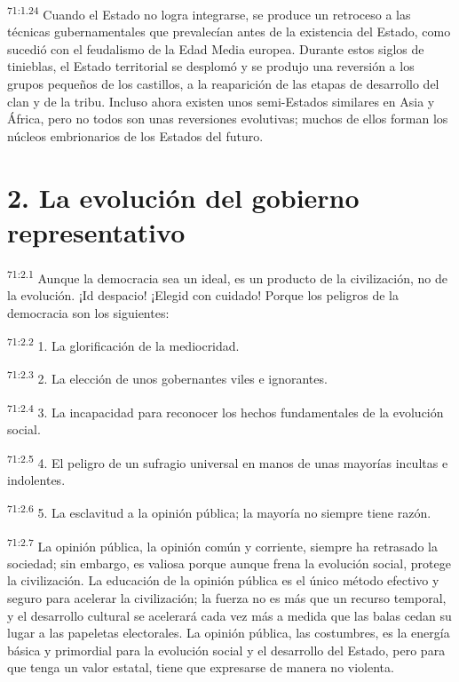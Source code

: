 \par
\textsuperscript{71:1.24} Cuando el Estado no logra integrarse, se produce un retroceso a las técnicas gubernamentales que prevalecían antes de la existencia del Estado, como sucedió con el feudalismo de la Edad Media europea. Durante estos siglos de tinieblas, el Estado territorial se desplomó y se produjo una reversión a los grupos pequeños de los castillos, a la reaparición de las etapas de desarrollo del clan y de la tribu. Incluso ahora existen unos semi-Estados similares en Asia y África, pero no todos son unas reversiones evolutivas; muchos de ellos forman los núcleos embrionarios de los Estados del futuro.

\section*{2. La evolución del gobierno representativo}
\par
\textsuperscript{71:2.1} Aunque la democracia sea un ideal, es un producto de la civilización, no de la evolución. ¡Id despacio! ¡Elegid con cuidado! Porque los peligros de la democracia son los siguientes:

\par
\textsuperscript{71:2.2} 1. La glorificación de la mediocridad.

\par
\textsuperscript{71:2.3} 2. La elección de unos gobernantes viles e ignorantes.

\par
\textsuperscript{71:2.4} 3. La incapacidad para reconocer los hechos fundamentales de la evolución social.

\par
\textsuperscript{71:2.5} 4. El peligro de un sufragio universal en manos de unas mayorías incultas e indolentes.

\par
\textsuperscript{71:2.6} 5. La esclavitud a la opinión pública; la mayoría no siempre tiene razón.

\par
\textsuperscript{71:2.7} La opinión pública, la opinión común y corriente, siempre ha retrasado la sociedad; sin embargo, es valiosa porque aunque frena la evolución social, protege la civilización. La educación de la opinión pública es el único método efectivo y seguro para acelerar la civilización; la fuerza no es más que un recurso temporal, y el desarrollo cultural se acelerará cada vez más a medida que las balas cedan su lugar a las papeletas electorales. La opinión pública, las costumbres, es la energía básica y primordial para la evolución social y el desarrollo del Estado, pero para que tenga un valor estatal, tiene que expresarse de manera no violenta.

